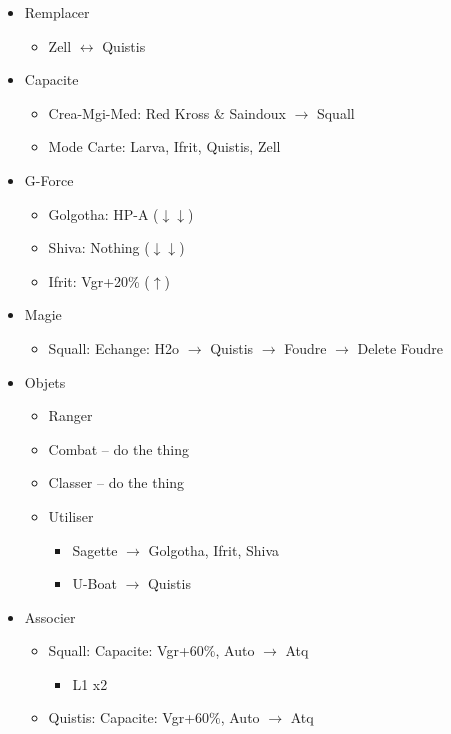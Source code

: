 \begin{menu}[51s]
	\begin{itemize}
		\item Remplacer
			\begin{itemize}
				\item Zell $\leftrightarrow$ Quistis
			\end{itemize}
		\item Capacite
			\begin{itemize}
				\item Crea-Mgi-Med: Red Kross \& Saindoux $\rightarrow$ Squall
				\item Mode Carte: Larva, Ifrit, Quistis, Zell
			\end{itemize}
		\item G-Force
			\begin{itemize}
				\item Golgotha: HP-A ($\downarrow\downarrow$)
				\item Shiva: Nothing ($\downarrow\downarrow$)
				\item Ifrit: Vgr+20\% ($\uparrow$)
			\end{itemize}
		\item Magie
			\begin{itemize}
				\item Squall: Echange: H2o $\rightarrow$ Quistis $\rightarrow$ Foudre $\rightarrow$ Delete Foudre
			\end{itemize}
		\item Objets
			\begin{itemize}
				\item Ranger
				\item Combat -- do the thing
				\item Classer -- do the thing
				\item Utiliser
					\begin{itemize}
						\item Sagette $\rightarrow$ Golgotha, Ifrit, Shiva
						\item U-Boat $\rightarrow$ Quistis
					\end{itemize}
			\end{itemize}
		\item Associer
			\begin{itemize}
				\item Squall: Capacite: Vgr+60\%, Auto $\rightarrow$ Atq
					\begin{itemize}
						\item L1 x2
					\end{itemize}
				\item Quistis: Capacite: Vgr+60\%, Auto $\rightarrow$ Atq
			\end{itemize}
	\end{itemize}
\end{menu}

